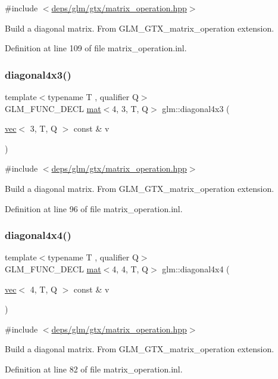 {\ttfamily \#include $<$\hyperlink{matrix__operation_8hpp}{deps/glm/gtx/matrix\+\_\+operation.\+hpp}$>$}

Build a diagonal matrix. From G\+L\+M\+\_\+\+G\+T\+X\+\_\+matrix\+\_\+operation extension. 

Definition at line 109 of file matrix\+\_\+operation.\+inl.

\mbox{\label{group__gtx__matrix__operation_gae235def5049d6740f0028433f5e13f90}} 
\subsubsection{\texorpdfstring{diagonal4x3()}{diagonal4x3()}}
{\footnotesize\ttfamily template$<$typename T , qualifier Q$>$ \\
G\+L\+M\+\_\+\+F\+U\+N\+C\+\_\+\+D\+E\+CL \hyperlink{structglm_1_1mat}{mat}$<$4, 3, T, Q$>$ glm\+::diagonal4x3 (\begin{DoxyParamCaption}\item[{\hyperlink{structglm_1_1vec}{vec}$<$ 3, T, Q $>$ const \&}]{v }\end{DoxyParamCaption})}



{\ttfamily \#include $<$\hyperlink{matrix__operation_8hpp}{deps/glm/gtx/matrix\+\_\+operation.\+hpp}$>$}

Build a diagonal matrix. From G\+L\+M\+\_\+\+G\+T\+X\+\_\+matrix\+\_\+operation extension. 

Definition at line 96 of file matrix\+\_\+operation.\+inl.

\mbox{\label{group__gtx__matrix__operation_ga0b4cd8dea436791b072356231ee8578f}} 
\subsubsection{\texorpdfstring{diagonal4x4()}{diagonal4x4()}}
{\footnotesize\ttfamily template$<$typename T , qualifier Q$>$ \\
G\+L\+M\+\_\+\+F\+U\+N\+C\+\_\+\+D\+E\+CL \hyperlink{structglm_1_1mat}{mat}$<$4, 4, T, Q$>$ glm\+::diagonal4x4 (\begin{DoxyParamCaption}\item[{\hyperlink{structglm_1_1vec}{vec}$<$ 4, T, Q $>$ const \&}]{v }\end{DoxyParamCaption})}



{\ttfamily \#include $<$\hyperlink{matrix__operation_8hpp}{deps/glm/gtx/matrix\+\_\+operation.\+hpp}$>$}

Build a diagonal matrix. From G\+L\+M\+\_\+\+G\+T\+X\+\_\+matrix\+\_\+operation extension. 

Definition at line 82 of file matrix\+\_\+operation.\+inl.

